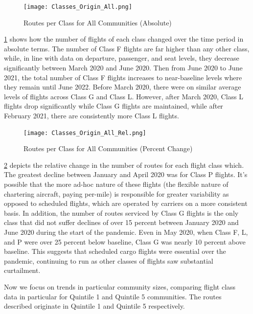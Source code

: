 \documentclass[11pt]{article}
\begin{document}
\begin{figure}[htbp]
\centerline{\texttt{[image: Classes\_Origin\_All.png]}}
\caption{Routes per Class for All Communities (Absolute)}
\label{Classes_Origin_All}
\end{figure}

\cref{Classes_Origin_All} shows how the number of flights of each class changed over the time period in absolute terms. The number of Class F flights are far higher than any other class, while, in line with data on departure, passenger, and seat levels, they decrease significantly between March 2020 and June 2020. Then from June 2020 to June 2021, the total number of Class F flights increases to near-baseline levels where they remain until June 2022. Before March 2020, there were on similar average levels of flights across Class G and Class L. However, after March 2020, Class L flights drop significantly while Class G flights are maintained, while after February 2021, there are consistently more Class L flights.

\begin{figure}[htbp]
\centerline{\texttt{[image: Classes\_Origin\_All\_Rel.png]}}
\caption{Routes per Class for All Communities (Percent Change)}
\label{Classes_Origin_All_Rel}
\end{figure}

\cref{Classes_Origin_All_Rel} depicts the relative change in the number of routes for each flight class which. The greatest decline between January and April 2020 was for Class P flights. It's possible that the more ad-hoc nature of these flights (the flexible nature of chartering aircraft, paying per-mile) is responsible for greater variability as opposed to scheduled flights, which are operated by carriers on a more consistent basis. In addition, the number of routes serviced by Class G flights is the only class that did not suffer declines of over 15 percent between January 2020 and June 2020 during the start of the pandemic. Even in May 2020, when Class F, L, and P were over 25 percent below baseline, Class G was nearly 10 percent above baseline. This suggests that scheduled cargo flights were essential over the pandemic, continuing to run as other classes of flights saw substantial curtailment.

\-\hspace{0.5cm} Now we focus on trends in particular community sizes, comparing flight class data in particular for Quintile 1 and Quintile 5 communities. The routes described originate in Quintile 1 and Quintile 5 respectively.
\end{document}
